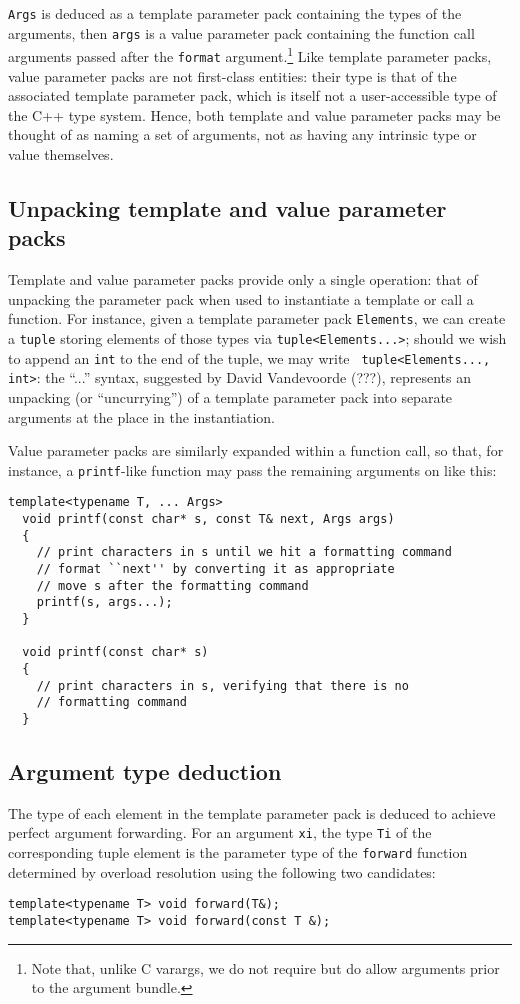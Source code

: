 \documentclass{article}
\begin{document}
{\tt Args} is deduced as a template parameter pack containing the types of
the arguments, then {\tt args} is a value parameter pack containing
the function call arguments passed after the {\tt format}
argument.\footnote{Note that, unlike C varargs, we do not require but
  do allow arguments prior to the argument bundle.} Like template
parameter packs, value parameter packs are not first-class entities:
their type is that of the associated template parameter pack, which is
itself not a user-accessible type of the C++ type system. 
Hence, both template and value
parameter packs may be thought of as naming a set of arguments, not as
having any intrinsic type or value themselves.

\subsection{Unpacking template and value parameter packs}
Template and value parameter packs provide only a single operation:
that of unpacking the parameter pack when used to instantiate a
template or call a function. For instance, given a template parameter
pack {\tt Elements}, we can create a {\tt tuple} storing elements of
those types via {\tt tuple<Elements...>}; should we wish to append an
{\tt int} to the end of the tuple, we may write {\tt
  tuple<Elements..., int>}: the ``...'' syntax, suggested
by David Vandevoorde (???), represents an unpacking (or
``uncurrying'') of a template parameter pack into separate
arguments at the place in the instantiation.

Value parameter packs are similarly expanded within a function call,
so that, for instance, a {\tt printf}-like function may pass the
remaining arguments on like this:
\begin{verbatim}
template<typename T, ... Args>
  void printf(const char* s, const T& next, Args args)
  {
    // print characters in s until we hit a formatting command
    // format ``next'' by converting it as appropriate
    // move s after the formatting command
    printf(s, args...);
  }

  void printf(const char* s)
  {
    // print characters in s, verifying that there is no 
    // formatting command
  }
\end{verbatim}

\subsection{Argument type deduction}
The type of each element in the template parameter pack is deduced to
achieve perfect argument forwarding. For an argument {\tt xi}, the
type {\tt Ti} of the corresponding tuple element is the parameter type
of the {\tt forward} function determined by overload resolution using
the following two candidates:
\begin{verbatim}
template<typename T> void forward(T&);
template<typename T> void forward(const T &);
\end{verbatim}
\end{document}

